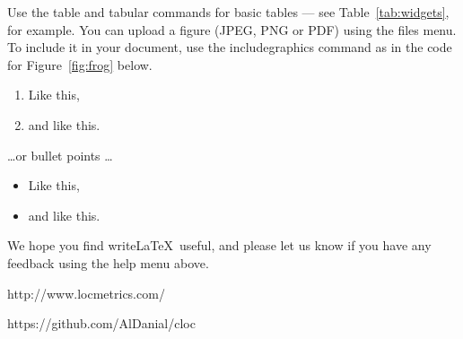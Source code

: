 Use the table and tabular commands for basic tables --- see Table~\ref{tab:widgets}, for example. You can upload a figure (JPEG, PNG or PDF) using the files menu. To include it in your document, use the includegraphics command as in the code for Figure~\ref{fig:frog} below.


\begin{enumerate}
\item Like this,
\item and like this.
\end{enumerate}
\dots or bullet points \dots
\begin{itemize}
\item Like this,
\item and like this.
\end{itemize}

We hope you find write\LaTeX\ useful, and please let us know if you have any feedback using the help menu above.

\newpage
\begin{thebibliography}{9}
	http://www.locmetrics.com/
	
	https://github.com/AlDanial/cloc
	
	
	
\end{thebibliography}
